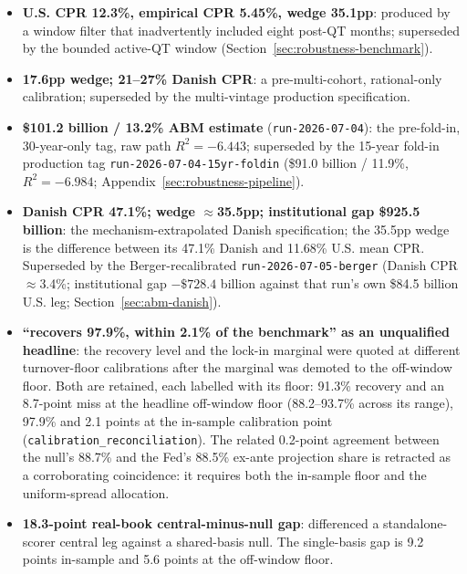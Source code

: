 \documentclass[12pt]{article}
\begin{document}
\begingroup\sloppy
\begin{itemize}
\item \textbf{U.S. CPR 12.3\%, empirical CPR 5.45\%, wedge 35.1pp}: produced by a window filter that inadvertently included eight post-QT months; superseded by the bounded active-QT window (Section~\ref{sec:robustness-benchmark}).
\item \textbf{17.6pp wedge; 21--27\% Danish CPR}: a pre-multi-cohort, rational-only calibration; superseded by the multi-vintage production specification.
\item \textbf{\$101.2 billion / 13.2\% ABM estimate} (\texttt{run-2026-07-04}): the pre-fold-in, 30-year-only tag, raw path $R^2 = -6.443$; superseded by the 15-year fold-in production tag \texttt{run-2026-07-04-15yr-foldin} (\$91.0 billion / 11.9\%, $R^2 = -6.984$; Appendix~\ref{sec:robustness-pipeline}).
\item \textbf{Danish CPR 47.1\%; wedge $\approx$35.5pp; institutional gap \$925.5 billion}: the mechanism-extrapolated Danish specification; the 35.5pp wedge is the difference between its 47.1\% Danish and 11.68\% U.S. mean CPR. Superseded by the Berger-recalibrated \texttt{run-2026-07-05-berger} (Danish CPR $\approx$3.4\%; institutional gap $-\$728.4$ billion against that run's own \$84.5 billion U.S. leg; Section~\ref{sec:abm-danish}).
\item \textbf{``recovers 97.9\%, within 2.1\% of the benchmark'' as an unqualified headline}: the recovery level and the lock-in marginal were quoted at different turnover-floor calibrations after the marginal was demoted to the off-window floor. Both are retained, each labelled with its floor: 91.3\% recovery and an 8.7-point miss at the headline off-window floor (88.2--93.7\% across its range), 97.9\% and 2.1 points at the in-sample calibration point (\texttt{calibration\_reconciliation}). The related 0.2-point agreement between the null's 88.7\% and the Fed's 88.5\% ex-ante projection share is retracted as a corroborating coincidence: it requires both the in-sample floor and the uniform-spread allocation.

\item \textbf{18.3-point real-book central-minus-null gap}: differenced a standalone-scorer central leg against a shared-basis null. The single-basis gap is 9.2 points in-sample and 5.6 points at the off-window floor.


\end{itemize}
\end{document}
